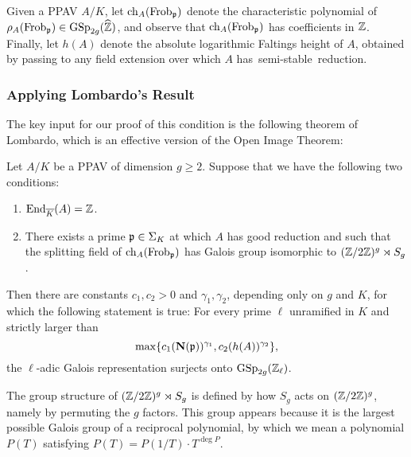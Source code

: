 Given a PPAV $A/K$, let $\operatorname{ch}_A(\operatorname{Frob}_\mathfrak p)$ denote the characteristic polynomial of $\rho_A(\operatorname{Frob}_\mathfrak p) \in \operatorname{GSp}_{2g}(\widehat{\mathbb Z})$, and observe that $\operatorname{ch}_A(\operatorname{Frob}_\mathfrak p)$ has coefficients in $\mathbb Z$.
Finally, let $h(A)$ denote the absolute logarithmic Faltings height of $A$, obtained by passing to any field extension over which $A$ \mbox{has semi-stable reduction.}

\subsubsection{Applying Lombardo's Result}

The key input for our proof of this condition is the following theorem of Lombardo, which is an effective version of the Open Image Theorem:

\begin{theorem}
\label{theorem:lombardo}
		Let $A / K$ be a PPAV of dimension $g \ge 2$. Suppose that we have the following two conditions:
		\begin{enumerate}[(1)]
			\item $\operatorname{End}_{\overline{K}}(A) = {\mathbb Z}$.
			\item There exists a prime $\mathfrak{p} \in \Sigma_K$ at which $A$ has good reduction and such that the splitting field of $\operatorname{ch}_A(\operatorname{Frob}_{\mathfrak{p}})$ has Galois group isomorphic to $({\mathbb Z}/2{\mathbb Z})^g \rtimes S_g$.
		\end{enumerate}
		Then there are constants $c_1, c_2 > 0$ and $\gamma_1, \gamma_2$,
		depending only on $g$ and $K$, for which the following statement is true: For every prime $\ell$ unramified in $K$ and strictly larger than
		\[
		\max \{ c_1 (\mathbf{N} (\mathfrak{p}))^{\gamma_1}, c_2 (h(A))^{\gamma_2}\},
		\]
		the $\ell$-adic Galois representation surjects onto $\operatorname{GSp}_{2g}({\mathbb Z}_\ell)$.
	\end{theorem}

	\begin{remark}\label{remark:gee}
		The group structure of $({\mathbb Z}/2{\mathbb Z})^g \rtimes S_g$ is defined by how $S_g$ acts on $({\mathbb Z} / 2{\mathbb Z})^g$, namely by permuting the $g$ factors. This group appears because it is the largest possible Galois group of a reciprocal polynomial, by which we mean a polynomial $P(T)$ satisfying $P(T) = P(1/T) \cdot T^{\deg P}$.
	\end{remark}
	
